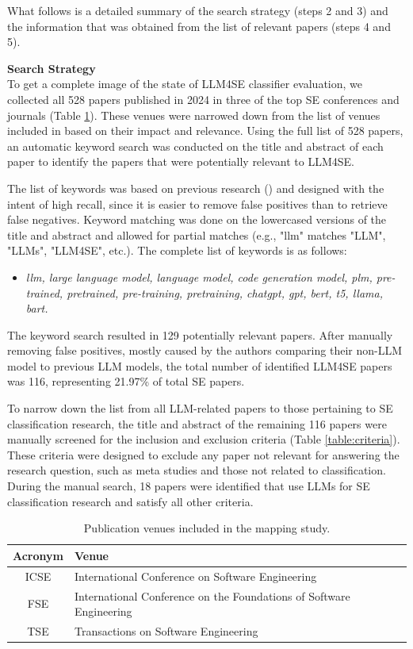 \documentclass[a4paper]{article}
\begin{document}
What follows is a detailed summary of the search strategy (steps 2 and 3) and the information that was obtained from the list of relevant papers (steps 4 and 5). 

\textbf{Search Strategy}\\
To get a complete image of the state of LLM4SE classifier evaluation, we collected all 528 papers published in 2024 in three of the top SE conferences and journals (Table \ref{table:venues}). These venues were narrowed down from the list of venues included in \cite{hou2024} based on their impact and relevance. Using the full list of 528 papers, an automatic keyword search was conducted on the title and abstract of each paper to identify the papers that were potentially relevant to LLM4SE.

The list of keywords was based on previous research (\cite{zhang2024,hou2024}) and designed with the intent of high recall, since it is easier to remove false positives than to retrieve false negatives. Keyword matching was done on the lowercased versions of the title and abstract and allowed for partial matches (e.g., "llm" matches "LLM", "LLMs", "LLM4SE", etc.). The complete list of keywords is as follows:
\begin{itemize}
	\item \textit{llm, large language model, language model, code generation model, plm, pre-trained, pretrained, pre-training, pretraining, chatgpt, gpt, bert, t5, llama, bart.}
\end{itemize}

The keyword search resulted in 129 potentially relevant papers. After manually removing false positives, mostly caused by the authors comparing their non-LLM model to previous LLM models, the total number of identified LLM4SE papers was 116, representing 21.97\% of total SE papers. 

To narrow down the list from all LLM-related papers to those pertaining to SE classification research, the title and abstract of the remaining 116 papers were manually screened for the inclusion and exclusion criteria (Table \ref{table:criteria}). These criteria were designed to exclude any paper not relevant for answering the research question, such as meta studies and those not related to classification. During the manual search, 18 papers were identified that use LLMs for SE classification research and satisfy all other criteria. 

\begin{table}[H]
	\raggedright
	\caption{Publication venues included in the mapping study.}
	\begin{tabularx}{\textwidth}{|c|X|} \hline
		\textbf{Acronym} & \textbf{Venue} \\ \hline
		ICSE  & International Conference on Software Engineering \\ \hline
		FSE   & International Conference on the Foundations of Software Engineering \\ \hline
		TSE   & Transactions on Software Engineering \\ \hline
	\end{tabularx}
	\label{table:venues}
\end{table}
\end{document}
